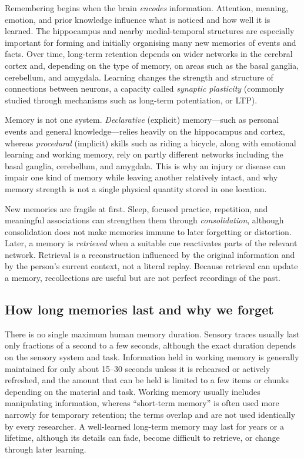 \documentclass[11pt,oneside]{report}
\begin{document}
Remembering begins when the brain \emph{encodes} information. Attention,
meaning, emotion, and prior knowledge influence what is noticed and how well it
is learned. The hippocampus and nearby medial-temporal structures are especially
important for forming and initially organising many new memories of events and
facts. Over time, long-term retention depends on wider networks in the cerebral
cortex and, depending on the type of memory, on areas such as the basal
ganglia, cerebellum, and amygdala. Learning changes the strength and structure
of connections between neurons, a capacity called \emph{synaptic plasticity}
(commonly studied through mechanisms such as long-term potentiation, or LTP).

Memory is not one system. \emph{Declarative} (explicit) memory—such as
personal events and general knowledge—relies heavily on the hippocampus and
cortex, whereas \emph{procedural} (implicit) skills such as riding a bicycle,
along with emotional learning and working memory, rely on partly different
networks including the basal ganglia, cerebellum, and amygdala. This is why an
injury or disease can impair one kind of memory while leaving another relatively
intact, and why memory strength is not a single physical quantity stored in one
location.

New memories are fragile at first. Sleep, focused practice, repetition, and
meaningful associations can strengthen them through \emph{consolidation},
although consolidation does not make memories immune to later forgetting or
distortion. Later, a memory is \emph{retrieved} when a suitable cue reactivates
parts of the relevant network. Retrieval is a reconstruction influenced by the
original information and by the person's current context, not a literal replay.
Because retrieval can update a memory, recollections are useful but are not
perfect recordings of the past.

\subsection*{How long memories last and why we forget}

There is no single maximum human memory duration. Sensory traces usually last
only fractions of a second to a few seconds, although the exact duration depends
on the sensory system and task. Information held in working memory is generally
maintained for only about 15--30 seconds unless it is rehearsed or actively
refreshed, and the amount that can be held is limited to a few items or chunks
depending on the material and task.
Working memory usually includes manipulating information, whereas ``short-term
memory'' is often used more narrowly for temporary retention; the terms overlap
and are not used identically by every researcher. A well-learned long-term
memory may last for years or a lifetime, although its details can fade, become
difficult to retrieve, or change through later learning.
\end{document}

